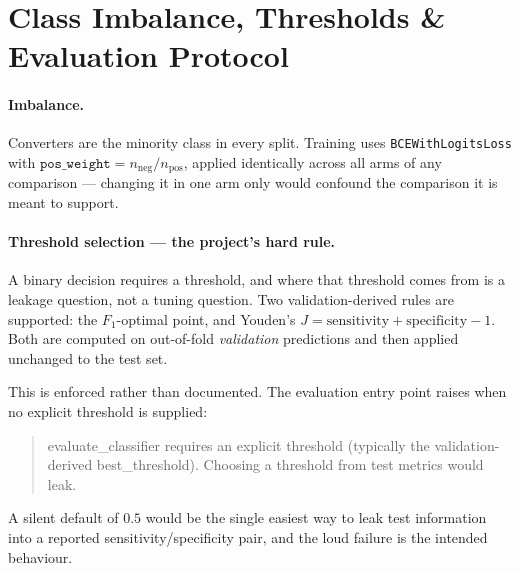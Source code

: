 
\section{Class Imbalance, Thresholds \& Evaluation Protocol}
\label{sec:thresholds}

\paragraph{Imbalance.} Converters are the minority class in every split. Training uses
\texttt{BCEWithLogitsLoss} with $\texttt{pos\_weight} = n_{\mathrm{neg}}/n_{\mathrm{pos}}$,
applied identically across all arms of any comparison --- changing it in one arm only would
confound the comparison it is meant to support.

\paragraph{Threshold selection --- the project's hard rule.} A binary decision requires a
threshold, and where that threshold comes from is a leakage question, not a tuning question.
Two validation-derived rules are supported: the $F_1$-optimal point, and Youden's
$J = \mathrm{sensitivity} + \mathrm{specificity} - 1$. Both are computed on out-of-fold
\emph{validation} predictions and then applied unchanged to the test set.

This is enforced rather than documented. The evaluation entry point raises when no explicit
threshold is supplied:

\begin{quote}\small\ttfamily
  evaluate\_classifier requires an explicit threshold (typically the validation-derived
  best\_threshold). Choosing a threshold from test metrics would leak.
\end{quote}

A silent default of $0.5$ would be the single easiest way to leak test information into a
reported sensitivity/specificity pair, and the loud failure is the intended behaviour.

